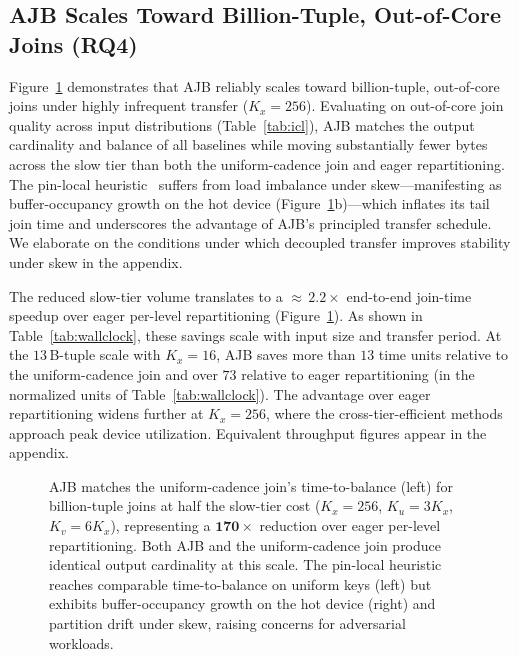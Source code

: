 \documentclass{article}
\begin{document}
\subsection{AJB Scales Toward Billion-Tuple, Out-of-Core Joins (RQ4)}
\label{sec:rq4}

Figure~\ref{fig:billion} demonstrates that AJB reliably scales toward
billion-tuple, out-of-core joins under highly infrequent transfer ($K_x = 256$).
Evaluating on out-of-core join quality across input distributions
(Table~\ref{tab:icl}), AJB matches the output cardinality and balance of all
baselines while moving substantially fewer bytes across the slow tier than both
the uniform-cadence join and eager repartitioning. The pin-local
heuristic~\citep{maltry2025multigpu} suffers from load imbalance under
skew---manifesting as buffer-occupancy growth on the hot device
(Figure~\ref{fig:billion}b)---which inflates its tail join time and underscores
the advantage of AJB's principled transfer schedule. We elaborate on the
conditions under which decoupled transfer improves stability under skew in the
appendix.

The reduced slow-tier volume translates to a ${\approx}\,2.2\times$ end-to-end
join-time speedup over eager per-level repartitioning (Figure~\ref{fig:billion}).
As shown in Table~\ref{tab:wallclock}, these savings scale with input size and
transfer period. At the $13$\,B-tuple scale with $K_x = 16$, AJB saves more than
$13$ time units relative to the uniform-cadence join and over $73$ relative to
eager repartitioning (in the normalized units of Table~\ref{tab:wallclock}). The
advantage over eager repartitioning widens further at $K_x = 256$, where the
cross-tier-efficient methods approach peak device utilization. Equivalent
throughput figures appear in the appendix.

\begin{figure}[t]
\centering
\caption{AJB matches the uniform-cadence join's time-to-balance (left) for
billion-tuple joins at half the slow-tier cost ($K_x = 256$, $K_u = 3K_x$,
$K_v = 6K_x$), representing a $\mathbf{170\times}$ reduction over eager per-level
repartitioning. Both AJB and the uniform-cadence join produce identical output
cardinality at this scale. The pin-local heuristic reaches comparable
time-to-balance on uniform keys (left) but exhibits buffer-occupancy growth on
the hot device (right) and partition drift under skew, raising concerns for
adversarial workloads.}
\label{fig:billion}
\end{figure}
\end{document}
